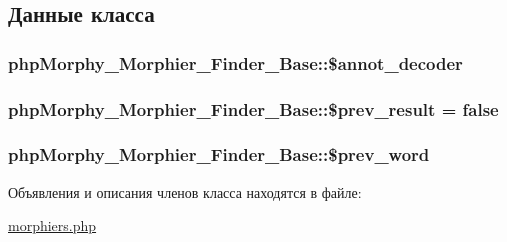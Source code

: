 \subsection{Данные класса}
\hypertarget{classphpMorphy__Morphier__Finder__Base_ad525f89634e2ef3e179908ea4b936ae6}{
\subsubsection[{\$annot\_\-decoder}]{\setlength{\rightskip}{0pt plus 5cm}phpMorphy\_\-Morphier\_\-Finder\_\-Base::\$annot\_\-decoder}}
\label{classphpMorphy__Morphier__Finder__Base_ad525f89634e2ef3e179908ea4b936ae6}
\hypertarget{classphpMorphy__Morphier__Finder__Base_ae41544cad6701cb6fd78a0e8e0a0408b}{
\subsubsection[{\$prev\_\-result}]{\setlength{\rightskip}{0pt plus 5cm}phpMorphy\_\-Morphier\_\-Finder\_\-Base::\$prev\_\-result = false}}
\label{classphpMorphy__Morphier__Finder__Base_ae41544cad6701cb6fd78a0e8e0a0408b}
\hypertarget{classphpMorphy__Morphier__Finder__Base_ab498547df9861068a2e5e89b106591ca}{
\subsubsection[{\$prev\_\-word}]{\setlength{\rightskip}{0pt plus 5cm}phpMorphy\_\-Morphier\_\-Finder\_\-Base::\$prev\_\-word}}
\label{classphpMorphy__Morphier__Finder__Base_ab498547df9861068a2e5e89b106591ca}


Объявления и описания членов класса находятся в файле:\begin{DoxyCompactItemize}
\item 
\hyperlink{morphiers_8php}{morphiers.php}\end{DoxyCompactItemize}
